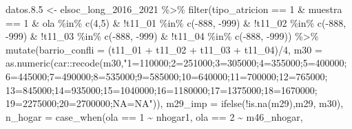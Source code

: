 \documentclass[
  12pt,
]{book}
\newenvironment{Shaded}{\begin{snugshade}}{\end{snugshade}}
\newcommand{\AttributeTok}[1]{\textcolor[rgb]{0.77,0.63,0.00}{#1}}
\newcommand{\DecValTok}[1]{\textcolor[rgb]{0.00,0.00,0.81}{#1}}
\newcommand{\FloatTok}[1]{\textcolor[rgb]{0.00,0.00,0.81}{#1}}
\newcommand{\FunctionTok}[1]{\textcolor[rgb]{0.00,0.00,0.00}{#1}}
\newcommand{\NormalTok}[1]{#1}
\newcommand{\OtherTok}[1]{\textcolor[rgb]{0.56,0.35,0.01}{#1}}
\newcommand{\SpecialCharTok}[1]{\textcolor[rgb]{0.00,0.00,0.00}{#1}}
\newcommand{\StringTok}[1]{\textcolor[rgb]{0.31,0.60,0.02}{#1}}
\begin{document}
\begin{Shaded}
\begin{Highlighting}[]
\NormalTok{datos.}\FloatTok{8.5} \OtherTok{\textless{}{-}}\NormalTok{ elsoc\_long\_2016\_2021 }\SpecialCharTok{\%\textgreater{}\%} 
  \FunctionTok{filter}\NormalTok{(tipo\_atricion }\SpecialCharTok{==} \DecValTok{1} \SpecialCharTok{\&}\NormalTok{ muestra }\SpecialCharTok{==} \DecValTok{1} \SpecialCharTok{\&}\NormalTok{ ola }\SpecialCharTok{\%in\%} \FunctionTok{c}\NormalTok{(}\DecValTok{4}\NormalTok{,}\DecValTok{5}\NormalTok{) }\SpecialCharTok{\&} \SpecialCharTok{!}\NormalTok{t11\_01 }\SpecialCharTok{\%in\%} \FunctionTok{c}\NormalTok{(}\SpecialCharTok{{-}}\DecValTok{888}\NormalTok{, }\SpecialCharTok{{-}}\DecValTok{999}\NormalTok{) }\SpecialCharTok{\&}
           \SpecialCharTok{!}\NormalTok{t11\_02 }\SpecialCharTok{\%in\%} \FunctionTok{c}\NormalTok{(}\SpecialCharTok{{-}}\DecValTok{888}\NormalTok{, }\SpecialCharTok{{-}}\DecValTok{999}\NormalTok{) }\SpecialCharTok{\&} \SpecialCharTok{!}\NormalTok{t11\_03 }\SpecialCharTok{\%in\%} \FunctionTok{c}\NormalTok{(}\SpecialCharTok{{-}}\DecValTok{888}\NormalTok{, }\SpecialCharTok{{-}}\DecValTok{999}\NormalTok{) }\SpecialCharTok{\&} \SpecialCharTok{!}\NormalTok{t11\_04 }\SpecialCharTok{\%in\%} \FunctionTok{c}\NormalTok{(}\SpecialCharTok{{-}}\DecValTok{888}\NormalTok{, }\SpecialCharTok{{-}}\DecValTok{999}\NormalTok{)) }\SpecialCharTok{\%\textgreater{}\%} 
  \FunctionTok{mutate}\NormalTok{(}\AttributeTok{barrio\_confli =}\NormalTok{ (t11\_01 }\SpecialCharTok{+}\NormalTok{ t11\_02 }\SpecialCharTok{+}\NormalTok{ t11\_03 }\SpecialCharTok{+}\NormalTok{ t11\_04)}\SpecialCharTok{/}\DecValTok{4}\NormalTok{,}
         \AttributeTok{m30 =} \FunctionTok{as.numeric}\NormalTok{(car}\SpecialCharTok{::}\FunctionTok{recode}\NormalTok{(m30,}\StringTok{"1=110000;2=251000;3=305000;4=355000;5=400000;}
\StringTok{                                           6=445000;7=490000;8=535000;9=585000;10=640000;11=700000;12=765000;}
\StringTok{                                           13=845000;14=935000;15=1040000;16=1180000;17=1375000;18=1670000;}
\StringTok{                                           19=2275000;20=2700000;NA=NA"}\NormalTok{)),}
         \AttributeTok{m29\_imp =} \FunctionTok{ifelse}\NormalTok{(}\SpecialCharTok{!}\FunctionTok{is.na}\NormalTok{(m29),m29, m30),}
         \AttributeTok{n\_hogar =} \FunctionTok{case\_when}\NormalTok{(ola }\SpecialCharTok{==} \DecValTok{1} \SpecialCharTok{\textasciitilde{}}\NormalTok{ nhogar1, ola }\SpecialCharTok{==} \DecValTok{2} \SpecialCharTok{\textasciitilde{}}\NormalTok{ m46\_nhogar,}

\end{Highlighting}
\end{Shaded}
\end{document}
